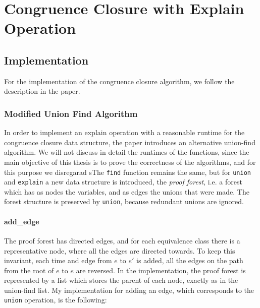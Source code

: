 
\chapter{Congruence Closure with Explain Operation}\label{chapter:congruence_closure}

\section{Implementation}

For the implementation of the congruence closure algorithm, we follow the description in the paper. \cite{Nieuwenhuis}

\subsection{Modified Union Find Algorithm}

In order to implement an explain operation with a reasonable runtime for the congruence closure data structure, the paper \cite{Nieuwenhuis} introduces an alternative union-find algorithm. We will not discuss in detail the runtimes of the functions, since the main objective of this thesis is to prove the correctness of the algorithms, and for this purpose we disregarad sThe \lstinline{find} function remains the same, but for \lstinline{union} and \lstinline{explain} a new data structure is introduced, the \emph{proof forest}, i.e. a forest which has as nodes the variables, and as edges the unions that were made. The forest structure is preserved by \lstinline{union}, because redundant unions are ignored.


\subsubsection{add\_edge}
\label{subsubsection:addedge}

The proof forest has directed edges, and for each equivalence class there is a representative node, where all the edges are directed towards. To keep this invariant, each time and edge from $e$ to $e'$ is added, all the edges on the path from the root of $e$ to $e$ are reversed.
In the implementation, the proof forest is represented by a list which stores the parent of each node, exactly as in the union-find list. My implementation for adding an edge, which corresponds to the \lstinline{union} operation, is the following:

